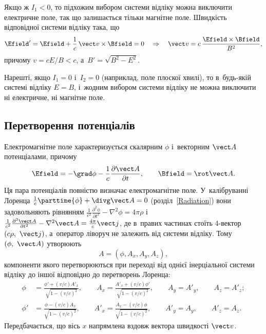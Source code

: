Якщо ж $I_1 < 0$, то підхожим вибором системи відліку можна виключити електричне поле, так
що залишається тільки магнітне поле. Швидкість відповідної системи відліку така, що
\begin{equation*}
	\Efield' = \Efield + \frac1c\,\vect v\times\Bfield = 0 \quad\Rightarrow\quad \vect v =
	c\,\frac{\Efield\times\Bfield}{B^2},
\end{equation*}
причому $v = cE/B < c$, а~$B' = \sqrt{B^2 - E^2}$.

Нарешті, якщо $I_1 = 0$ і~$I_2 = 0$ (наприклад, поле плоскої хвилі), то в~будь-якій
системі відліку $E = B$, і~жодним вибором системи відліку не можна виключити ні
електричне, ні магнітне поле.

\subsection*{Перетворення потенціалів}

Електромагнітне поле характеризується скалярним $\phi$ і~векторним $\vect A$ потенціалами,
причому
\begin{equation*}
	\Efield = -\grad\phi - \frac1c\frac{\partial\vect A}{\partial t}, \qquad \Bfield =
	\rot\vect A.
\end{equation*}
Ця пара потенціалів повністю визначає електромагнітне поле. У~калібруванні Лоренца
$\frac1c\parttime{\phi} + \divg\vect A = 0$ (розділ~\ref{Radiation}) вони задовольняють рівнянням
$\frac1{c^2}\frac{\partial^2\phi}{\partial t^2} - \nabla^2\phi = 4\pi\rho$ і~$\frac1{c^2}\frac{\partial^2\vect A}{\partial t^2} - \nabla^2\vect A = \frac{4\pi}{c}\vect j$,
де в~правих частинах стоїть 4-вектор $(c\rho,\ \vect j)$, а~оператор ліворуч не залежить від системи відліку. Тому
$(\phi,\ \vect A)$ утворюють 
\begin{equation*}
	A = (\phi, A_x, A_y, A_z),
\end{equation*}
компоненти якого перетворюються при переході від однієї інерціальної системи відліку до
іншої відповідно до перетворень Лоренца:
\begin{equation}\label{eq:PotentialTransform}
		\begin{aligned}
			\phi &= \frac{\phi' + (v/c)A'_x}{\sqrt{1-(v/c)^2}}, \qquad
			A_x = \frac{A'_x + (v/c)\phi'}{\sqrt{1-(v/c)^2}}, \qquad A_y = A'_y, \qquad
			A_z = A'_z; \\[8pt]
			\phi' &= \frac{\phi - (v/c)A_x}{\sqrt{1-(v/c)^2}}, \qquad
			A'_x = \frac{A_x - (v/c)\phi}{\sqrt{1-(v/c)^2}}, \qquad A'_y = A_y, \qquad
			A'_z = A_z.
		\end{aligned}
\end{equation}
Передбачається, що вісь $x$ напрямлена вздовж вектора швидкості $\vect v$.

